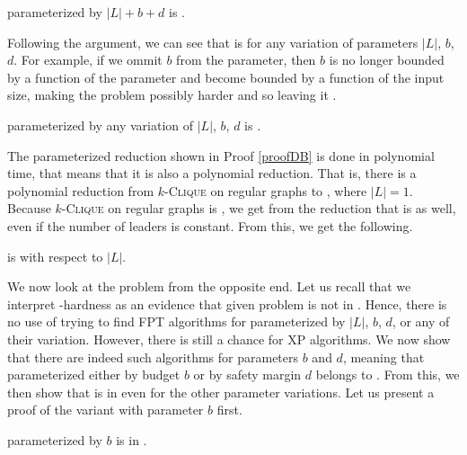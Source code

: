 \begin{remark}\label{cor:LnBD:Wh}
    \HL parameterized by $|L|+b+d$ is \Wh.
\end{remark}

Following the argument, we can see that \HL is \Wh for any variation of parameters $|L|$, $b$, $d$.
For example, if we ommit $b$ from the parameter, then $b$ is no longer bounded by a function of the parameter and
become bounded by a function of the input size, making the problem possibly harder and so leaving it \Wh.

\begin{corollary}\label{cor:LnBD:variation:Wh}
    \HL parameterized by any variation of $|L|$, $b$, $d$ is \Wh.
\end{corollary}

The parameterized reduction shown in Proof \ref{proofDB} is done in polynomial time,
that means that it is also a polynomial reduction.
That is, there is a polynomial reduction from $k$-\textsc{Clique} on regular graphs to \HL, where $|L| = 1$.
Because $k$-\textsc{Clique} on regular graphs is \NPh, we get from the reduction that \HL is \NPh as well,
even if the number of leaders is constant.
From this, we get the following.

\begin{corollary}\label{cor:Ln:pNPh}
    \HL is \pNPh with respect to $|L|$.
\end{corollary}


We now look at the problem from the opposite end.
Let us recall that we interpret \W-hardness as an evidence that given problem is not in \FPT.
Hence, there is no use of trying to find FPT algorithms for \HL parameterized by $|L|$, $b$, $d$, or any of their variation.
However, there is still a chance for XP algorithms.
We now show that there are indeed such algorithms for parameters $b$ and $d$, meaning that
\HL parameterized either by budget $b$ or by safety margin $d$ belongs to \XP.
From this, we then show that \HLshort is in \XP even for the other parameter variations.
Let us present a proof of the variant with parameter $b$ first.

\begin{theorem}\label{theorem:B:XP}
    \HL parameterized by $b$ is in \XP.
\end{theorem}


